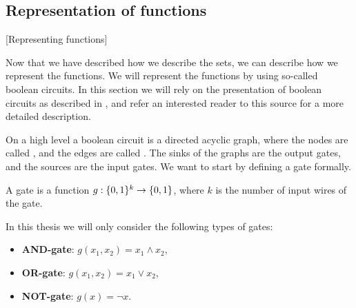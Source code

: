 \subsection{Representation of functions}[Representing functions]

Now that we have described how we describe the sets, we can describe how we represent the functions. We will represent the functions by using so-called boolean circuits. In this section we will rely on the presentation of boolean circuits as described in , and refer an interested reader to this source for a more detailed description.

On a high level a boolean circuit is a directed acyclic graph, where the nodes are called , and the edges are called . The sinks of the graphs are the output gates, and the sources are the input gates. We want to start by defining a gate formally.

\begin{definition}[Gate]
    A gate is a function $g : \{0, 1\}^k \rightarrow \{0, 1\}$, where $k$ is the number of input wires of the gate.
\end{definition}

In this thesis we will only consider the following types of gates:
\begin{itemize}
    \item \textbf{AND-gate}: $g(x_1, x_2) = x_1 \land x_2$,
    \item \textbf{OR-gate}: $g(x_1, x_2) = x_1 \lor x_2$,
    \item \textbf{NOT-gate}: $g(x) = \lnot x$.
\end{itemize}

